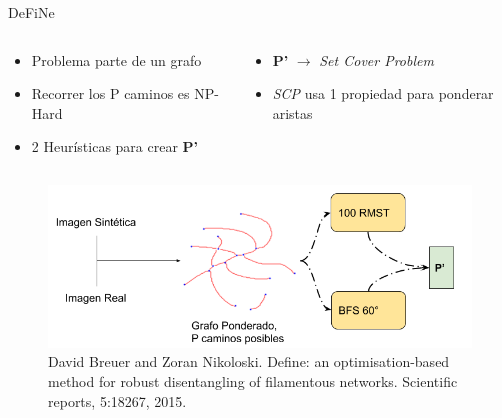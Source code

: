 \documentclass[aspectratio=169]{beamer}
\begin{document}
\begin{frame}{DeFiNe}
    \begin{columns}
        \begin{column}{0.55\textwidth}
            \begin{itemize}\fontsize{9pt}{5}\selectfont
                \item Problema parte de un grafo
                \item Recorrer los P caminos es NP-Hard
                \item 2 Heur\'isticas para crear {\bf P'}
            \end{itemize}        
        \end{column}
        \begin{column}{0.45\textwidth}
            \begin{itemize}\fontsize{9pt}{7.2}\selectfont
                
                \item {\bf P'} $\rightarrow$ {\it Set Cover Problem}
                \item {\it SCP} usa 1 propiedad para ponderar aristas
            \end{itemize}
        \end{column}
    \end{columns}
    \begin{figure}
        \centering
        \includegraphics[scale=0.42]{Pictures/flujoDefine2.png}
        \caption{David Breuer and Zoran Nikoloski. Define: an optimisation-based method for robust disentangling of filamentous networks. Scientific reports, 5:18267, 2015.}
    \end{figure}
\end{frame}
\end{document}
